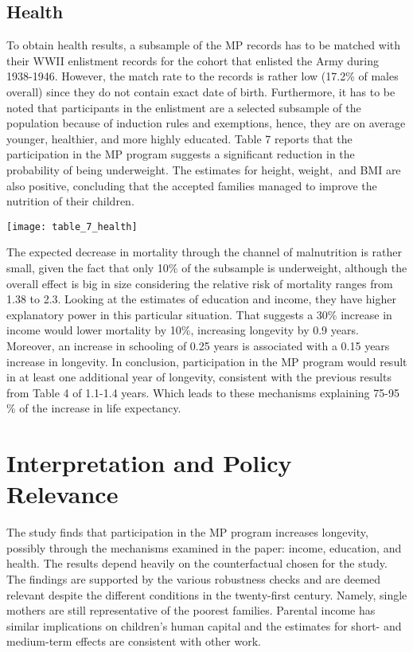 \subsection{Health}
To obtain health results, a subsample of the MP records has to be
matched with their WWII enlistment records for the cohort that enlisted
the Army during 1938-1946. However, the match rate to the records is
rather low (17.2\% of males overall) since they do not contain
exact date of birth. Furthermore, it has to be noted that participants
in the enlistment are a selected subsample of the population because of
induction rules and exemptions, hence, they are on average younger,
healthier, and more highly educated. Table 7 reports that the
participation in the MP program suggests a significant reduction in the
probability of being underweight. The estimates for height, weight,~and
BMI are also positive, concluding that the accepted families managed to
improve the nutrition of their children.
\begin{figure*}[h!]
\begin{center}
\texttt{[image: table\_7\_health]}
\end{center}
\end{figure*}
The expected decrease in mortality through the channel of malnutrition
is rather small, given the fact that only 10\% of the subsample is
underweight, although the overall effect is big in size considering the
relative risk of mortality ranges from 1.38 to
2.3. Looking at the estimates of education and income, they have
higher explanatory power in this particular situation. That suggests a
30\% increase in income would lower mortality by 10\%, increasing
longevity by 0.9 years. Moreover, an increase in schooling of 0.25 years
is associated with a 0.15 years increase in longevity. In conclusion,
participation in the MP program would result in at least one additional
year of longevity, consistent with the previous results from Table 4 of
1.1-1.4 years. Which leads to these mechanisms explaining 75-95 \% of
the increase in life expectancy.
\section{Interpretation and Policy Relevance}
The study finds that participation in the MP program increases
longevity, possibly through the mechanisms examined in the paper:
income, education, and health. The results depend heavily on the
counterfactual chosen for the study. The findings are supported by the
various robustness checks and are deemed relevant despite the different
conditions in the twenty-first century. Namely, single mothers are still
representative of the poorest families. Parental income has similar
implications on children's human capital and the estimates for short-
and medium-term effects are consistent with other work.
